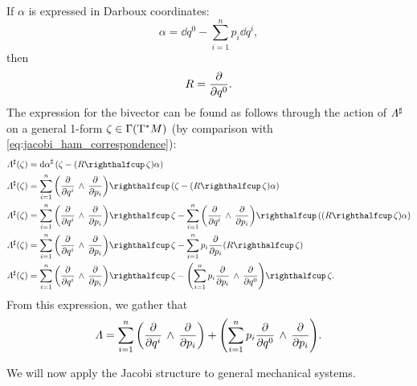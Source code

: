 If \(\alpha\) is expressed in Darboux coordinates:
\begin{equation}
     \alpha = \dd{q}^0 - \sum^n_{i = 1} p_i\dd{q^i},
\end{equation}
then
\begin{equation}
     R = \pdv{}{q^0}.
\end{equation}
The expression for the bivector can be found as follows through the action of \(
\Lambda^\sharp\) on a general 1-form \(\zeta \in \mathrm{\Gamma}\qty(\mathrm{T}^*M)\) (by comparison with \cref{eq:jacobi_ham_correspondence}):
\begin{equation}
    \begin{split}
        \fromDual{\Lambda}(\zeta) &= \fromDual{\dd{\alpha}}\qty(\zeta - (\intpr{R}{\zeta})\alpha) \\
        \fromDual{\Lambda}(\zeta) &= \intpr{\sum_{i=1}^n\qty(\wedgep{\pdv{}{q^i}}{\pdv{}{p_i}})}{(\zeta - (\intpr{R}{\zeta})\alpha)} \\
        \fromDual{\Lambda}(\zeta) &= \intpr{\sum_{i=1}^n\qty(\wedgep{\pdv{}{q^i}}{\pdv{}{p_i}})}{\zeta} 
                                     - \intpr{\sum_{i=1}^n\qty(\wedgep{\pdv{}{q^i}}{\pdv{}{p_i}})}{((\intpr{R}{\zeta})\alpha)} \\
        \fromDual{\Lambda}(\zeta) &= \intpr{\sum_{i=1}^n\qty(\wedgep{\pdv{}{q^i}}{\pdv{}{p_i}})}{\zeta} 
                                     - \sum_{i=1}^n p_i \pdv{}{p_i}(\intpr{R}{\zeta}) (\intpr{R}{\zeta})\\
        \fromDual{\Lambda}(\zeta) &= \intpr{\sum_{i=1}^n\qty(\wedgep{\pdv{}{q^i}}{\pdv{}{p_i}})}{\zeta} 
                                     - \intpr{\qty(\sum_{i=1}^n p_i \wedgep{\pdv{}{p_i}}{\pdv{}{q^0}})}{\zeta}. \\
    \end{split}
\end{equation}
From this expression, we gather that 
\begin{equation}
     \Lambda = \sum_{i=1}^n \qty( \pdv{}{q^i}\,\wedge\,\pdv{}{p_i} ) + \qty(\sum_{i=1}^n p_i  \pdv{}{q^0}\,\wedge\,\pdv{}{p_i} ).
\end{equation}

We will now apply the Jacobi structure to general mechanical systems.

